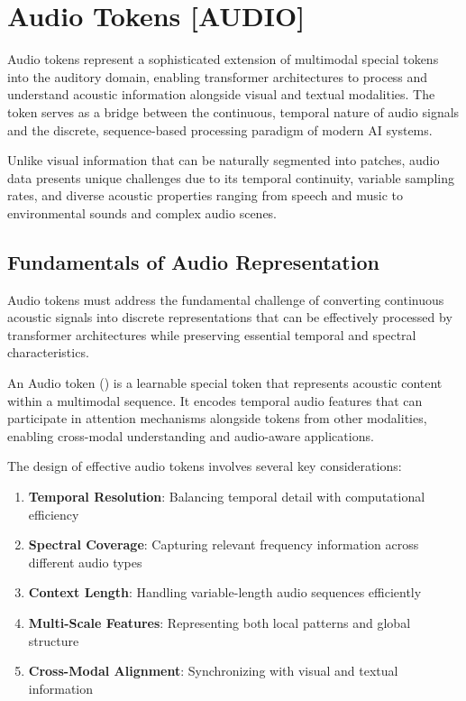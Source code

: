 
\section{Audio Tokens [AUDIO]}

Audio tokens represent a sophisticated extension of multimodal special tokens into the auditory domain, enabling transformer architectures to process and understand acoustic information alongside visual and textual modalities. The  token serves as a bridge between the continuous, temporal nature of audio signals and the discrete, sequence-based processing paradigm of modern AI systems.

Unlike visual information that can be naturally segmented into patches, audio data presents unique challenges due to its temporal continuity, variable sampling rates, and diverse acoustic properties ranging from speech and music to environmental sounds and complex audio scenes.

\subsection{Fundamentals of Audio Representation}

Audio tokens must address the fundamental challenge of converting continuous acoustic signals into discrete representations that can be effectively processed by transformer architectures while preserving essential temporal and spectral characteristics.

\begin{definition}
An Audio token () is a learnable special token that represents acoustic content within a multimodal sequence. It encodes temporal audio features that can participate in attention mechanisms alongside tokens from other modalities, enabling cross-modal understanding and audio-aware applications.
\end{definition}

The design of effective audio tokens involves several key considerations:

\begin{enumerate}
\item \textbf{Temporal Resolution}: Balancing temporal detail with computational efficiency
\item \textbf{Spectral Coverage}: Capturing relevant frequency information across different audio types
\item \textbf{Context Length}: Handling variable-length audio sequences efficiently
\item \textbf{Multi-Scale Features}: Representing both local patterns and global structure
\item \textbf{Cross-Modal Alignment}: Synchronizing with visual and textual information
\end{enumerate}

